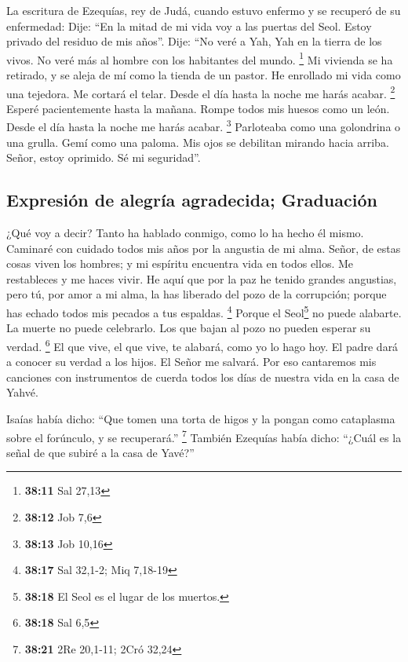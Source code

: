  La escritura de Ezequías, rey de Judá, cuando estuvo
enfermo y se recuperó de su enfermedad:  Dije: ``En la
mitad de mi vida voy a las puertas del Seol. Estoy privado del residuo
de mis años''.  Dije: ``No veré a Yah, Yah en la tierra
de los vivos. No veré más al hombre con los habitantes del mundo.
\footnote{\textbf{38:11} Sal 27,13}  Mi vivienda se ha
retirado, y se aleja de mí como la tienda de un pastor. He enrollado mi
vida como una tejedora. Me cortará el telar. Desde el día hasta la noche
me harás acabar. \footnote{\textbf{38:12} Job 7,6} 
Esperé pacientemente hasta la mañana. Rompe todos mis huesos como un
león. Desde el día hasta la noche me harás acabar. \footnote{\textbf{38:13}
  Job 10,16}  Parloteaba como una golondrina o una
grulla. Gemí como una paloma. Mis ojos se debilitan mirando hacia
arriba. Señor, estoy oprimido. Sé mi seguridad''.

\hypertarget{expresiuxf3n-de-alegruxeda-agradecida-graduaciuxf3n}{%
\subsection{Expresión de alegría agradecida;
Graduación}\label{expresiuxf3n-de-alegruxeda-agradecida-graduaciuxf3n}}

 ¿Qué voy a decir? Tanto ha hablado conmigo, como lo ha
hecho él mismo. Caminaré con cuidado todos mis años por la angustia de
mi alma.  Señor, de estas cosas viven los hombres; y mi
espíritu encuentra vida en todos ellos. Me restableces y me haces vivir.
 He aquí que por la paz he tenido grandes angustias, pero
tú, por amor a mi alma, la has liberado del pozo de la corrupción;
porque has echado todos mis pecados a tus espaldas. \footnote{\textbf{38:17}
  Sal 32,1-2; Miq 7,18-19}  Porque el Seol\footnote{\textbf{38:18}
  El Seol es el lugar de los muertos.} no puede alabarte. La muerte no
puede celebrarlo. Los que bajan al pozo no pueden esperar su verdad.
\footnote{\textbf{38:18} Sal 6,5}  El que vive, el que
vive, te alabará, como yo lo hago hoy. El padre dará a conocer su verdad
a los hijos.  El Señor me salvará. Por eso cantaremos mis
canciones con instrumentos de cuerda todos los días de nuestra vida en
la casa de Yahvé.

 Isaías había dicho: ``Que tomen una torta de higos y la
pongan como cataplasma sobre el forúnculo, y se recuperará.''
\footnote{\textbf{38:21} 2Re 20,1-11; 2Cró 32,24} 
También Ezequías había dicho: ``¿Cuál es la señal de que subiré a la
casa de Yavé?''

